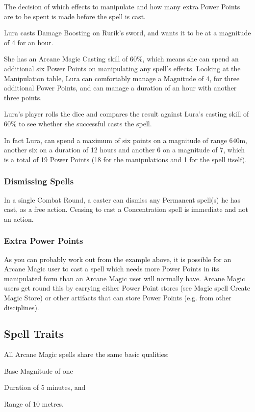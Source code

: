 The decision of which effects to manipulate and how many extra Power Points are to be spent is made before the spell is cast.

\begin{rpg-examplebox}
Lura casts Damage Boosting on Rurik’s sword, and wants it to be at a magnitude of 4 for an hour.

She has an Arcane Magic Casting skill of 60\%, which means she can spend an additional six Power Points on manipulating any spell’s effects. Looking at the Manipulation table, Lura can comfortably manage a Magnitude of 4, for three additional Power Points, and can manage a duration of an hour with another three points. 

Lura’s player rolls the dice and compares the result against Lura’s casting skill of 60\% to see whether she successful casts the spell.

In fact Lura, can spend a maximum of six points on a magnitude of range 640m, another six on a duration of 12 hours and another 6 on a magnitude of 7, which is a total of 19 Power Points (18 for the manipulations and 1 for the spell itself).
\end{rpg-examplebox}


\subsubsection{Dismissing Spells}
In a single Combat Round, a caster can dismiss any Permanent spell(s) he has cast, as a free action. Ceasing to cast a Concentration spell is immediate and not an action. 


\subsubsection{Extra Power Points}
As you can probably work out from the example above, it is possible for an Arcane Magic user to cast a spell which needs more Power Points in its manipulated form than an Arcane Magic user will normally have. Arcane Magic users get round this by carrying either Power Point stores (see Magic spell Create Magic Store) or other artifacts that can store Power Points (e.g. from other disciplines).


\subsection{Spell Traits}
All Arcane Magic spells share the same basic qualities:

\begin{rpg-list}
\item Base Magnitude of one 
\item Duration of 5 minutes, and
\item Range of 10 metres.
\end{rpg-list}

